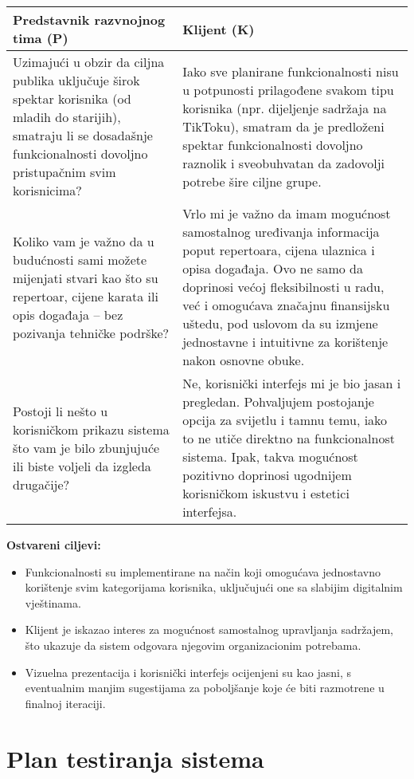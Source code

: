 \noindent
\begin{tabularx}{\textwidth}{|X|X|}
\hline
\textbf{Predstavnik razvnojnog tima (P)} &
\textbf{Klijent (K)} \\
\hline
Uzimajući u obzir da ciljna publika uključuje širok spektar korisnika (od mladih do starijih), smatraju li se dosadašnje funkcionalnosti dovoljno pristupačnim svim korisnicima? &
Iako sve planirane funkcionalnosti nisu u potpunosti prilagođene svakom tipu korisnika (npr. dijeljenje sadržaja na TikToku), smatram da je predloženi spektar funkcionalnosti dovoljno raznolik i sveobuhvatan da zadovolji potrebe šire ciljne grupe. \\
\hline
Koliko vam je važno da u budućnosti sami možete mijenjati stvari kao što su repertoar, cijene karata ili opis događaja – bez pozivanja tehničke podrške? &
Vrlo mi je važno da imam mogućnost samostalnog uređivanja informacija poput repertoara, cijena ulaznica i opisa događaja. Ovo ne samo da doprinosi većoj fleksibilnosti u radu, već i omogućava značajnu finansijsku uštedu, pod uslovom da su izmjene jednostavne i intuitivne za korištenje nakon osnovne obuke. \\
\hline
Postoji li nešto u korisničkom prikazu sistema što vam je bilo zbunjujuće ili biste voljeli da izgleda drugačije? &
Ne, korisnički interfejs mi je bio jasan i pregledan. Pohvaljujem postojanje opcija za svijetlu i tamnu temu, iako to ne utiče direktno na funkcionalnost sistema. Ipak, takva mogućnost pozitivno doprinosi ugodnijem korisničkom iskustvu i estetici interfejsa.
\\
\hline
\end{tabularx}

\bigskip

\textbf{Ostvareni ciljevi:}
\begin{itemize}
  \item Funkcionalnosti su implementirane na način koji omogućava jednostavno korištenje svim kategorijama korisnika, uključujući one sa slabijim digitalnim vještinama.
  \item Klijent je iskazao interes za mogućnost samostalnog upravljanja sadržajem, što ukazuje da sistem odgovara njegovim organizacionim potrebama.
  \item Vizuelna prezentacija i korisnički interfejs ocijenjeni su kao jasni, s eventualnim manjim sugestijama za poboljšanje koje će biti razmotrene u finalnoj iteraciji.
\end{itemize}

\sloppy
\section{Plan testiranja sistema}

